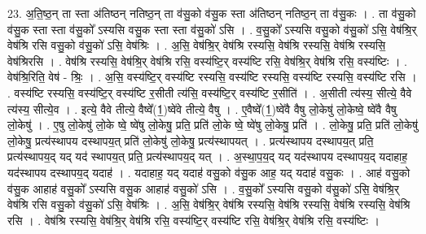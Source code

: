 \documentclass[17pt]{extarticle}
\begin{document}
23. अ॒ति॒ष्ठ॒न् ता स्ता अ॑तिष्ठन् नतिष्ठ॒न् ता व॑सु॒को व॑सु॒क स्ता अ॑तिष्ठन् नतिष्ठ॒न् ता व॑सु॒कः । . ता व॑सु॒को व॑सु॒क स्ता स्ता व॑सु॒को᳚ ऽस्यसि वसु॒क स्ता स्ता व॑सु॒को॑ ऽसि । . व॒सु॒को᳚ ऽस्यसि वसु॒को व॑सु॒को॑ ऽसि॒ वेष॑श्रि॒र् वेष॑श्रि रसि वसु॒को व॑सु॒को॑ ऽसि॒ वेष॑श्रिः । . अ॒सि॒ वेष॑श्रि॒र् वेष॑श्रि रस्यसि॒ वेष॑श्रि रस्यसि॒ वेष॑श्रि रस्यसि॒ वेष॑श्रिरसि । . वेष॑श्रि रस्यसि॒ वेष॑श्रि॒र् वेष॑श्रि रसि॒ वस्य॑ष्टि॒र् वस्य॑ष्टि रसि॒ वेष॑श्रि॒र् वेष॑श्रि रसि॒ वस्य॑ष्टिः । . वेष॑श्रि॒रिति॒ वेष॑ - श्रिः॒ । . अ॒सि॒ वस्य॑ष्टि॒र् वस्य॑ष्टि रस्यसि॒ वस्य॑ष्टि रस्यसि॒ वस्य॑ष्टि रस्यसि॒ वस्य॑ष्टि रसि । . वस्य॑ष्टि रस्यसि॒ वस्य॑ष्टि॒र् वस्य॑ष्टि र॒सीती त्य॑सि॒ वस्य॑ष्टि॒र् वस्य॑ष्टि र॒सीति॑ । . अ॒सीती त्य॑स्य॒ सीत्ये॒ वैवे त्य॑स्य॒ सीत्ये॒व । . इत्ये॒ वैवे तीत्ये॒ वैष्वे᳚(1॒)ष्वे॑वे तीत्ये॒ वैषु । . ए॒वैष्वे᳚(1॒)ष्वे॑वै वैषु लो॒केषु॑ लो॒केष्वे॒ ष्वे॑वै वैषु लो॒केषु॑ । . ए॒षु लो॒केषु॑ लो॒के ष्वे॒ ष्वे॑षु लो॒केषु॒ प्रति॒ प्रति॑ लो॒के ष्वे॒ ष्वे॑षु लो॒केषु॒ प्रति॑ । . लो॒केषु॒ प्रति॒ प्रति॑ लो॒केषु॑ लो॒केषु॒ प्रत्य॑स्थापय दस्थापय॒त् प्रति॑ लो॒केषु॑ लो॒केषु॒ प्रत्य॑स्थापयत् । . प्रत्य॑स्थापय दस्थापय॒त् प्रति॒ प्रत्य॑स्थापय॒द् यद् यद॑ स्थापय॒त् प्रति॒ प्रत्य॑स्थापय॒द् यत् । . अ॒स्था॒प॒य॒द् यद् यद॑स्थापय दस्थापय॒द् यदाहाह॒ यद॑स्थापय दस्थापय॒द् यदाह॑ । . यदाहाह॒ यद् यदाह॑ वसु॒को व॑सु॒क आह॒ यद् यदाह॑ वसु॒कः । . आह॑ वसु॒को व॑सु॒क आहाह॑ वसु॒को᳚ ऽस्यसि वसु॒क आहाह॑ वसु॒को॑ ऽसि । . व॒सु॒को᳚ ऽस्यसि वसु॒को व॑सु॒को॑ ऽसि॒ वेष॑श्रि॒र् वेष॑श्रि रसि वसु॒को व॑सु॒को॑ ऽसि॒ वेष॑श्रिः । . अ॒सि॒ वेष॑श्रि॒र् वेष॑श्रि रस्यसि॒ वेष॑श्रि रस्यसि॒ वेष॑श्रि रस्यसि॒ वेष॑श्रि रसि । . वेष॑श्रि रस्यसि॒ वेष॑श्रि॒र् वेष॑श्रि रसि॒ वस्य॑ष्टि॒र् वस्य॑ष्टि रसि॒ वेष॑श्रि॒र् वेष॑श्रि रसि॒ वस्य॑ष्टिः । \newline
\end{document}
